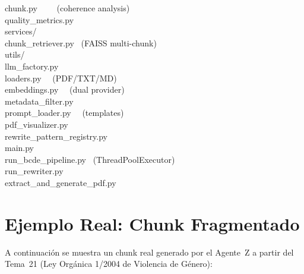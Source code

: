 \documentclass[10pt,twocolumn,letterpaper]{article}
\begin{document}
\begin{tcolorbox}[colback=bglight, colframe=bordercolor, boxrule=0.5pt, arc=2pt]
{\hspace*{1.5em}chunk.py ~~~~(coherence analysis)\\
\hspace*{1.5em}quality\_metrics.py\\
\hspace*{0.5em}services/\\
\hspace*{1.5em}chunk\_retriever.py ~(FAISS multi-chunk)\\
\hspace*{0.5em}utils/\\
\hspace*{1.5em}llm\_factory.py\\
\hspace*{1.5em}loaders.py ~~(PDF/TXT/MD)\\
\hspace*{1.5em}embeddings.py ~~(dual provider)\\
\hspace*{1.5em}metadata\_filter.py\\
\hspace*{1.5em}prompt\_loader.py ~~(templates)\\
\hspace*{1.5em}pdf\_visualizer.py\\
\hspace*{1.5em}rewrite\_pattern\_registry.py\\
\hspace*{0.5em}main.py\\
\hspace*{0.5em}run\_bcde\_pipeline.py ~(ThreadPoolExecutor)\\
\hspace*{0.5em}run\_rewriter.py\\
\hspace*{0.5em}extract\_and\_generate\_pdf.py
}
\end{tcolorbox}

\section{Ejemplo Real: Chunk Fragmentado}
\label{app:chunk}

A continuaci\'on se muestra un chunk real generado por el Agente~Z a partir del
Tema~21 (Ley Org\'anica 1/2004 de Violencia de G\'enero):
\end{document}
